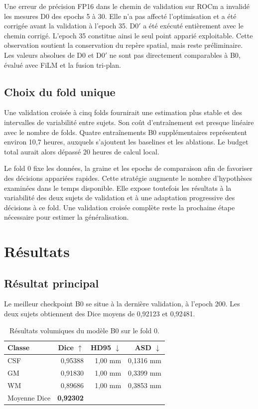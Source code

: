 \documentclass[11pt,a4paper]{article}
\begin{document}
Une erreur de précision FP16 dans le chemin de validation sur ROCm a invalidé
les mesures D0 des epochs 5 à 30. Elle n'a pas affecté l'optimisation et a été
corrigée avant la validation à l'epoch 35. D0$'$ a été exécuté entièrement avec
le chemin corrigé. L'epoch 35 constitue ainsi le seul point apparié exploitable.
Cette observation soutient la conservation du repère spatial, mais reste
préliminaire. Les valeurs absolues de D0 et D0$'$ ne sont pas directement
comparables à B0, évalué avec FiLM et la fusion tri-plan.

\subsection{Choix du fold unique}

Une validation croisée à cinq folds fournirait une estimation plus stable et
des intervalles de variabilité entre sujets. Son coût d'entraînement est presque
linéaire avec le nombre de folds. Quatre entraînements B0 supplémentaires
représentent environ 10,7 heures, auxquels s'ajoutent les baselines et les
ablations. Le budget total aurait alors dépassé 20 heures de calcul local.

Le fold 0 fixe les données, la graine et les epochs de comparaison afin de
favoriser des décisions appariées rapides. Cette stratégie augmente le nombre
d'hypothèses examinées dans le temps disponible. Elle expose toutefois les
résultats à la variabilité des deux sujets de validation et à une adaptation
progressive des décisions à ce fold. Une validation croisée complète reste la
prochaine étape nécessaire pour estimer la généralisation.

\section{Résultats}

\subsection{Résultat principal}

Le meilleur checkpoint B0 se situe à la dernière validation, à l'epoch 200.
Les deux sujets obtiennent des Dice moyens de 0,92123 et 0,92481.

\begin{table}[htbp]
\centering
\caption{Résultats volumiques du modèle B0 sur le fold 0.}
\label{tab:main-results}
\begin{tabular}{@{}lrrr@{}}
\toprule
Classe & Dice $\uparrow$ & HD95 $\downarrow$ & ASD $\downarrow$ \\
\midrule
CSF & 0,95388 & 1,00 mm & 0,1316 mm \\
GM  & 0,91830 & 1,00 mm & 0,3399 mm \\
WM  & 0,89686 & 1,00 mm & 0,3853 mm \\
\midrule
Moyenne Dice & \textbf{0,92302} & & \\
\bottomrule
\end{tabular}
\end{table}
\end{document}
